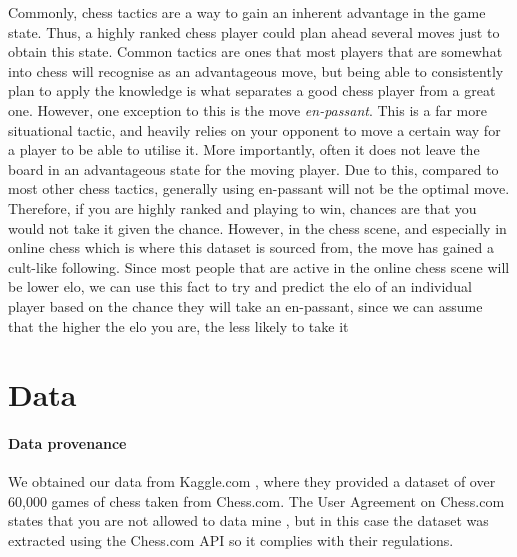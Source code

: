 \documentclass[10pt,a4paper,twocolumn]{article}
\begin{document}
Commonly, chess tactics are a way to gain an inherent advantage in the game state. Thus, a highly ranked chess player could plan ahead several moves just to obtain this state. Common tactics are ones that most players that are somewhat into chess will recognise as an advantageous move, but being able to consistently plan to apply the knowledge is what separates a good chess player from a great one. However, one exception to this is the move \textit{en-passant}. This is a far more situational tactic, and heavily relies on your opponent to move a certain way for a player to be able to utilise it. More importantly, often it does not leave the board in an advantageous state for the moving player. Due to this, compared to most other chess tactics, generally using en-passant will not be the optimal move. Therefore, if you are highly ranked and playing to win, chances are that you would not take it given the chance. However, in the chess scene, and especially in online chess which is where this dataset is sourced from, the move has gained a cult-like following. Since most people that are active in the online chess scene will be lower elo, we can use this fact to try and predict the elo of an individual player based on the chance they will take an en-passant, since we can assume that the higher the elo you are, the less likely to take it

\section{Data}


\paragraph{Data provenance}
We obtained our data from Kaggle.com \cite{Kaggle}, where they provided a dataset of over 60,000 games of chess taken from Chess.com. The User Agreement on Chess.com states that you are not allowed to data mine \cite{ChessT&C}, but in this case the dataset was extracted using the Chess.com API so it complies with their regulations.

\end{document}
